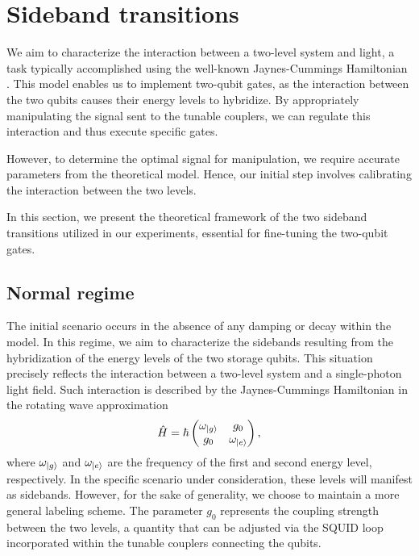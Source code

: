 \section{Sideband transitions}
\label{sec:sideband_transition}

We aim to characterize the interaction between a two-level system and light, a task typically accomplished using the well-known Jaynes-Cummings Hamiltonian \cite{haroche2006exploring}.
This model enables us to implement two-qubit gates, as the interaction between the two qubits causes their energy levels to hybridize.
By appropriately manipulating the signal sent to the tunable couplers, we can regulate this interaction and thus execute specific gates. 

However, to determine the optimal signal for manipulation, we require accurate parameters from the theoretical model.
Hence, our initial step involves calibrating the interaction between the two levels.

In this section, we present the theoretical framework of the two sideband transitions utilized in our experiments, essential for fine-tuning the two-qubit gates.

\subsection{Normal regime}

The initial scenario occurs in the absence of any damping or decay within the model.
In this regime, we aim to characterize the sidebands resulting from the hybridization of the energy levels of the two storage qubits.
This situation precisely reflects the interaction between a two-level system and a single-photon light field. 
Such interaction is described by the Jaynes-Cummings Hamiltonian in the rotating wave approximation
\begin{equation}
    \hat{H} = \hbar
    \begin{pmatrix}
        \omega_{\ket{g}} & g_0           \\
        g_0            & \omega_{\ket{e}}
    \end{pmatrix} ,
\end{equation}
where $\omega_{\ket{g}}$ and $\omega_{\ket{e}}$ are the frequency of the first and second energy level, respectively.
In the specific scenario under consideration, these levels will manifest as sidebands.
However, for the sake of generality, we choose to maintain a more general labeling scheme.
The parameter $g_0$ represents the coupling strength between the two levels, a quantity that can be adjusted via the SQUID loop incorporated within the tunable couplers connecting the qubits.


